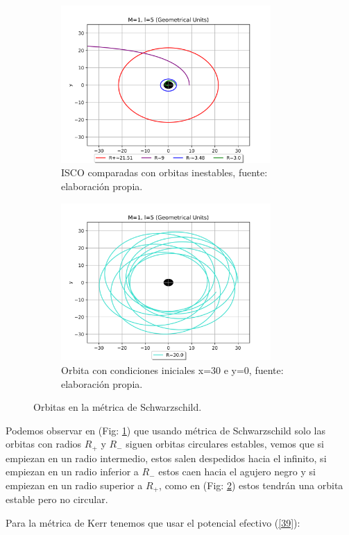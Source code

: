 \documentclass{article}
\begin{document}
\begin{figure}[H]
\begin{subfigure}{0.5\textwidth}
\includegraphics[width=0.9\linewidth, height=6cm]{ISCO.png} 
\caption{ISCO comparadas con orbitas inestables, fuente: elaboración propia.}
\label{fig:ISCO_S1}
\end{subfigure}\hspace{1cm}
\begin{subfigure}{0.5\textwidth}
\includegraphics[width=0.9\linewidth, height=6cm]{OrbitS_R=30.png}
\caption{Orbita con condiciones iniciales x=30 e y=0, fuente: elaboración propia.}
\label{fig:ISCO_S2}
\end{subfigure}
\caption{Orbitas en la métrica de Schwarzschild.}
\label{fig:ISCO_S}
\end{figure}

Podemos observar en (Fig: \ref{fig:ISCO_S1}) que usando métrica de Schwarzschild solo las orbitas con radios $R_{+}$ y $R_{-}$ siguen orbitas circulares estables, vemos que si empiezan en un radio intermedio, estos salen despedidos hacia el infinito, si empiezan en un radio inferior a $R_{-}$ estos caen hacia el agujero negro y si empiezan en un radio superior a $R_{+}$, como en (Fig: \ref{fig:ISCO_S2}) estos tendrán una orbita estable pero no circular.

Para la métrica de Kerr tenemos que usar el potencial efectivo (\ref{39}):
\end{document}
